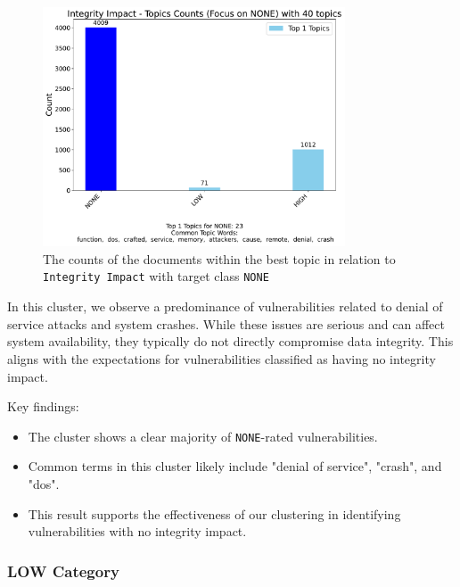 \documentclass[12pt]{article}
\begin{document}
\begin{figure}[ht]
	\centering
	\includegraphics[width=0.8\textwidth]{figures/integrityImpact/merged_top_k_topics_category_focus_counts_integrityImpact_NONE_k1.pdf}

	\caption{The counts of the documents within the best topic in relation to \texttt{Integrity
			Impact} with
		target class \texttt{NONE}}

	\label{fig:integrityImpact_60_NONE}
\end{figure}

In this cluster, we observe a predominance of vulnerabilities related to denial of service attacks
and system crashes. While these issues are serious and can affect system availability, they
typically do not directly compromise data integrity. This aligns with the expectations for
vulnerabilities classified as having no integrity impact.

Key findings:
\begin{itemize}

	\item The cluster shows a clear majority of \texttt{NONE}-rated vulnerabilities.

	\item Common terms in this cluster likely include "denial of service", "crash", and
	      "dos".

	\item This result supports the effectiveness of our clustering in identifying vulnerabilities
	      with no integrity impact.

\end{itemize}

\subsubsection*{LOW Category}
\end{document}
